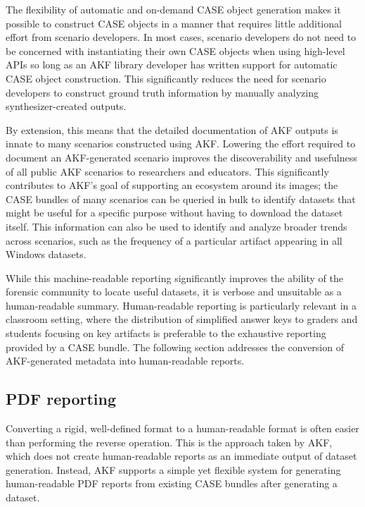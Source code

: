 \documentclass[final,5p,times,twocolumn]{elsarticle}
\begin{document}
The flexibility of automatic and on-demand CASE object generation makes
it possible to construct CASE objects in a manner that requires little
additional effort from scenario developers. In most cases, scenario
developers do not need to be concerned with instantiating their own CASE
objects when using high-level APIs so long as an AKF library developer
has written support for automatic CASE object construction. This
significantly reduces the need for scenario developers to construct
ground truth information by manually analyzing synthesizer-created
outputs.

By extension, this means that the detailed documentation of AKF outputs
is innate to many scenarios constructed using AKF. Lowering the effort
required to document an AKF-generated scenario improves the
discoverability and usefulness of all public AKF scenarios to
researchers and educators. This significantly contributes to AKF's goal
of supporting an ecosystem around its images; the CASE bundles of many
scenarios can be queried in bulk to identify datasets that might be
useful for a specific purpose without having to download the dataset
itself. This information can also be used to identify and analyze
broader trends across scenarios, such as the frequency of a particular
artifact appearing in all Windows datasets.

While this machine-readable reporting significantly improves the ability
of the forensic community to locate useful datasets, it is verbose and
unsuitable as a human-readable summary. Human-readable reporting is
particularly relevant in a classroom setting, where the distribution of
simplified answer keys to graders and students focusing on key artifacts
is preferable to the exhaustive reporting provided by a CASE bundle. The
following section addresses the conversion of AKF-generated metadata
into human-readable reports.

\subsection{PDF reporting}\label{pdf-reporting}

Converting a rigid, well-defined format to a human-readable format is
often easier than performing the reverse operation. This is the approach
taken by AKF, which does not create human-readable reports as an
immediate output of dataset generation. Instead, AKF supports a simple
yet flexible system for generating human-readable PDF reports from
existing CASE bundles after generating a dataset.
\end{document}
